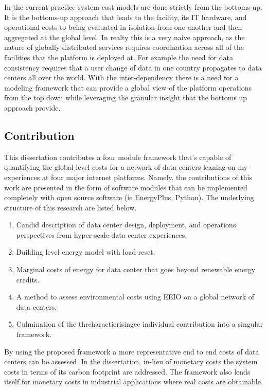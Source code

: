 In the current practice system cost models are done strictly from the bottoms-up. It is the bottoms-up approach that leads to the facility, its IT hardware, and operational costs to being evaluated in isolation from one another and then aggregated at the global level. In realty this is a very naive approach, as the nature of globally distributed services requires coordination across all of the facilities that the platform is deployed at. For example the need for data consistency requires that a user change of data in one country  propagates to data centers all over the world. With the inter-dependency there is a need for a modeling framework that can provide a global view of the platform operations from the top down while leveraging the granular insight that the bottoms up approach provide. 

\subsection{Contribution}
This dissertation contributes a four module framework that's capable of quantifying the global level costs for a network of data centers leaning on my experiences at four major internet platforms. Namely, the contributions of this work are presented in the form of software modules that can be implemented completely with open source software (ie EnergyPlus, Python). The underlying structure of this research are listed below.

\begin{enumerate}
    \item Candid description of data center design, deployment, and operations perspectives from hyper-scale data center experiences. 
    \item Building level energy model with load reset.
    \item Marginal costs of energy for data center that goes beyond renewable energy credits.
    \item A method to assess environmental costs using EEIO on a global network of data centers.
    \item Culmination of the thrcharactierisingee individual contribution into a singular framework.
\end{enumerate} 

By using the proposed framework a more representative end to end costs of data centers can be assessed. In the dissertation, in-lieu of monetary costs the system costs in terms of its carbon footprint are addressed. The framework also lends itself for monetary costs in industrial applications where real costs are obtainable.

